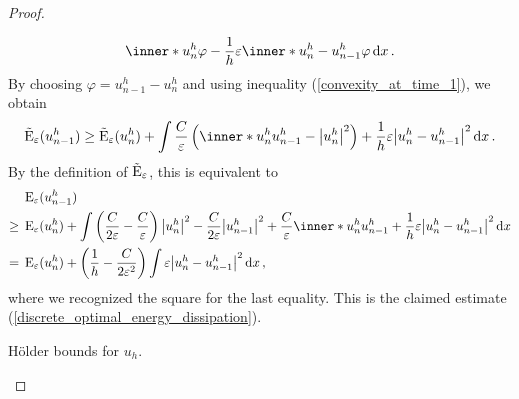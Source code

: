 \begin{proof}
\begin{description}[wide=0pt]
\begin{align*}
			\inner*{u_{ n }^{ h }}{\varphi}
			-
			\frac{ 1 }{ h }
			\varepsilon
			\inner*{ u_{ n }^{ h } - u_{ n - 1 } ^{ h } }{ \varphi }
			\dd{x}.
		\end{align*}
		By choosing $ \varphi = u_{ n - 1 }^{ h } - u_{ n }^{ h } $ 
		and using inequality (\ref{convexity_at_time_1}), we obtain
		\begin{equation*}
			\tilde{\energy}_{ \varepsilon } ( u_{ n - 1 }^{ h } ) 
			\geq
			\tilde{\energy}_{ \varepsilon} ( u_{ n }^{ h } )
			+
			\int
			\frac{ C }{ \varepsilon } 
			\left(
			\inner*{ u_{n }^{ h }}{ u_{ n - 1 }^{ h } }
			-
			\abs{ u_{ n }^{ h }}^{ 2 }
			\right)
			+
			\frac{ 1 }{ h }
			\varepsilon
			\abs{ u_{n }^{ h } - u_{ n -1 }^{ h } }^{ 2 }
			\dd{ x }.
		\end{equation*}
		By the definition of $ \tilde{ \operatorname{E} }_{ \varepsilon }  $, this is 
		equivalent to
		\begin{align*}
			& \energy_{ \varepsilon } (u_{ n - 1 }^{ h } )
			\\
			\geq {} &
			\energy_{ \varepsilon } (u_{ n }^{ h } ) +
			\int
			\left(
			\frac{ C }{ 2 \varepsilon }
			-
			\frac{ C }{ \varepsilon }
			\right)
			\abs{ u_{ n }^{ h } }^{ 2 }
			-
			\frac{ C }{ 2 \varepsilon }
			\abs{ u_{n - 1 }^{ h } }^{ 2 }
			+ 
			\frac{ C }{ \varepsilon }
			\inner*{ u_{ n }^{ h } }{ u_{ n - 1 }^{ h } }
			+ 
			\frac{ 1 }{ h }
			\varepsilon
			\abs{ u_{ n }^{ h } - u_{ n - 1 }^{ h } }^{ 2 }
			\dd{ x }
			\\
			= {} &
			\energy_{ \varepsilon } ( u_{n }^{ h } )
			+
			\left( 
			\frac{ 1 }{ h }
			- 
			\frac{ C }{ 2 \varepsilon^{ 2 } }
			\right)
			\int 
			\varepsilon \abs{ u_{n }^{ h } - u_{ n - 1 }^{ h } }^{ 2 }
			\dd{ x },
		\end{align*}
		where we recognized the square for the last equality.
		This is the claimed estimate 
		(\ref{discrete_optimal_energy_dissipation}).
		
		\item[Step 4:] Hölder bounds for $ u_{ h } $.
		

\end{description}
\end{proof}
